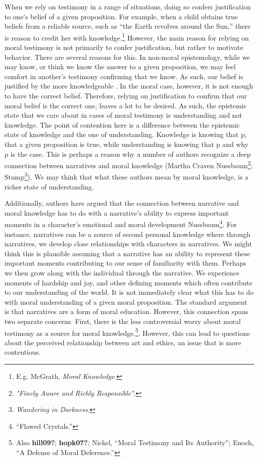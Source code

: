 \documentclass[phdthesis,12pt,final]{wuthesis}
\theoremstyle{definition}
\theoremstyle{definition}
\theoremstyle{definition}
\theoremstyle{definition}
\theoremstyle{remark}
\begin{document}
When we rely on testimony in a range of situations, doing so confers justification to one's belief of a given proposition. For example, when a child obtains true beliefs from a reliable source, such as ``the Earth revolves around the Sun,'' there is reason to credit her with knowledge.\footnote{E.g. McGrath, \emph{Moral {Knowledge}}.} However, the main reason for relying on moral testimony is not primarily to confer justification, but rather to motivate behavior. There are several reasons for this. In non-moral epistemology, while we may know, or think we know the answer to a given proposition, we may feel comfort in another's testimony confirming that we know. As such, our belief is justified by the more knowledgeable . In the moral case, however, it is not enough to have the correct belief. Therefore, relying on justification to confirm that our moral belief is the correct one, leaves a lot to be desired. As such, the epistemic state that we care about in cases of moral testimony is understanding and not knowledge. The point of contention here is a difference between the epistemic state of knowledge and the one of understanding. Knowledge is knowing that p, that a given proposition is true, while understanding is knowing that p and why p is the case. This is perhaps a reason why a number of authors recognize a deep connection between narratives and moral knowledge (Martha Craven Nussbaum\footnote{\emph{"{Finely Aware} and {Richly Responsible}"}.}; Stump\footnote{\emph{Wandering in {Darkness}}.}). We may think that what these authors mean by moral knowledge, is a richer state of understanding.

Additionally, authors have argued that the connection between narrative and moral knowledge has to do with a narrative's ability to express important moments in a character's emotional and moral development Nussbaum\footnote{{``Flawed {Crystals}.''}}. For instance, narratives can be a source of second personal knowledge where through narratives, we develop close relationships with characters in narratives. We might think this is plausible assuming that a narrative has an ability to represent these important moments contributing to our sense of familiarity with them. Perhaps we then grow along with the individual through the narrative. We experience moments of hardship and joy, and other defining moments which often contribute to our understanding of the world. It is not immediately clear what this has to do with moral understanding of a given moral proposition. The standard argument is that narratives are a form of moral education. However, this connection spans two separate concerns. First, there is the less controversial worry about moral testimony as a source for moral knowledge.\footnote{Also \textbf{hill09?}; \textbf{hopk07?}; Nickel, {``Moral {Testimony} and Its {Authority}''}; Enoch, {``A {Defense} of {Moral Deference}.''}}. However, this can lead to questions about the perceived relationship between art and ethics, an issue that is more contentious.
\end{document}
